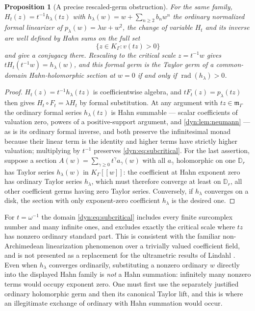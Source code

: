 \documentclass[11pt,letterpaper]{article}
\newtheorem{proposition}[proposition]{Proposition}
\theoremstyle{definition}
\theoremstyle{remark}
\newcommand{\m}{\mathfrak m}
\newcommand{\rad}{\operatorname{rad}}
\numberwithin{equation}{section}
\begin{document}
\begin{proposition}[A precise rescaled-germ obstruction]\label{dyn:prop:critical}
For the same family, $H_t(z)=t^{-1}h_\lambda(tz)$ with
$h_\lambda(w)=w+\sum_{n\ge2}b_nw^{n}$ the ordinary normalized formal
linearizer of $p_\lambda(w)=\lambda w+w^{2}$, the change of variable $H_t$
and its inverse are well defined by Hahn sums on the \emph{full} set
\begin{equation}\label{dyn:eq:subcritical}
 \{z\in K_\Gamma:v(tz)>0\}
\end{equation}
and give a conjugacy there. Rescaling to the critical scale $z=t^{-1}w$
gives $tH_t(t^{-1}w)=h_\lambda(w)$, and this formal germ is the Taylor germ
of a common-domain Hahn-holomorphic section at $w=0$ \emph{if and only if}
$\rad(h_\lambda)>0$.
\end{proposition}
\begin{proof}
$H_t(z)=t^{-1}h_\lambda(tz)$ is coefficientwise algebra, and
$tF_t(z)=p_\lambda(tz)$ then gives $H_t\circ F_t=\lambda H_t$ by formal
substitution. At any argument with $tz\in\m_\Gamma$ the ordinary formal
series $h_\lambda(tz)$ is Hahn summable --- scalar coefficients of
valuation zero, powers of a positive-support argument, and
\cref{dyn:lem:neumann} --- as is its ordinary formal inverse, and both
preserve the infinitesimal monad because their linear term is the identity
and higher terms have strictly higher valuation; multiplying by $t^{-1}$
preserves \eqref{dyn:eq:subcritical}. For the last assertion, suppose a
section $A(w)=\sum_{\gamma\ge0}t^{\gamma}a_\gamma(w)$ with all $a_\gamma$
holomorphic on one $\mathbb D_{r}$ has Taylor series $h_\lambda(w)$ in
$K_\Gamma[[w]]$: the coefficient at Hahn exponent zero has ordinary Taylor
series $h_\lambda$, which must therefore converge at least on
$\mathbb D_{r}$, all other coefficient germs having zero Taylor series.
Conversely, if $h_\lambda$ converges on a disk, the section with only
exponent-zero coefficient $h_\lambda$ is the desired one.
\end{proof}

For $t=\omega^{-1}$ the domain \eqref{dyn:eq:subcritical} includes every
finite surcomplex number and many infinite ones, and excludes exactly the
critical scale where $tz$ has nonzero ordinary standard part. This is
consistent with the familiar non-Archimedean linearization phenomenon over
a trivially valued coefficient field, and is not presented as a replacement
for the ultrametric results of Lindahl \cite{Lindahl}. Even when
$h_\lambda$ converges ordinarily, substituting a nonzero ordinary $w$
directly into the displayed Hahn family is \emph{not} a Hahn summation:
infinitely many nonzero terms would occupy exponent zero. One must first
use the separately justified ordinary holomorphic germ and then its
canonical Taylor lift, and this is where an illegitimate exchange of
ordinary with Hahn summation would occur.
\end{document}
